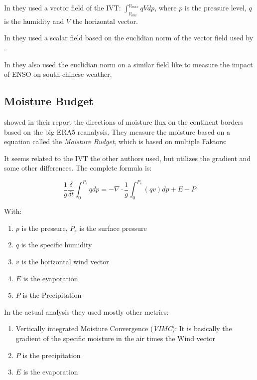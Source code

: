 In \cite{ralph2017dropsonde} they used a vector field of the IVT: $\int_{p_{low}}^{p_{max}} qV dp$, where $p$ is the pressure level, $q$ is the humidity and $V$ the horizontal vector.

In \cite{sousa2020north} they used a scalar field based on the euclidian norm of the vector field used by \cite{ralph2017dropsonde}.


In \cite{Ayantobo2021IntegratedMT} they also used the euclidian norm on a similar field like \cite{ralph2017dropsonde} to measure the impact of  ENSO on south-chinese weather.

\subsection{Moisture Budget}

\citeauthor{atmos13101694} showed in their report \cite{atmos13101694} the directions of moisture flux on the continent borders based on the big ERA5 reanalysis.
They measure the moisture based on a equation called the \textit{Moisture Budget}, which is based on multiple Faktors: 



It seems related to the IVT the other authors used, but utilizes the gradient and some other differences. The complete formula is:

$$
\frac{1}{g} \frac{\delta}{\delta t} \int^{P_s}_0 q dp = - \nabla \cdot \frac{1}{g} \int^{P_s}_0 (qv) dp + E - P
$$

With: 

\begin{enumerate}
  \item $p$ is the pressure, $P_s$ is the surface pressure
  \item $q$ is the specific humidity
  \item $v$ is the horizontal wind vector
  \item $E$ is the evaporation
  \item $P$ is the Precipitation
\end{enumerate}


In the actual analysis they used mostly other metrics:


\begin{enumerate}
  \item Vertically integrated Moisture Convergence (\textit{VIMC}): It is basically the gradient of the specific moisture in the air times the Wind vector
  \item $P$ is the precipitation 
  \item $E$ is the evaporation
\end{enumerate}

